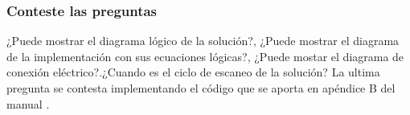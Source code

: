\subsubsection{Conteste las preguntas}
¿Puede mostrar el diagrama lógico de la solución?, ¿Puede mostrar el diagrama de la implementación con sus  ecuaciones lógicas?, ¿Puede mostar el diagrama de conexión eléctrico?.¿Cuando es el ciclo de escaneo de la solución? La ultima pregunta se contesta implementando el código que se aporta en apéndice B del manual \cite{LOGO1}.




